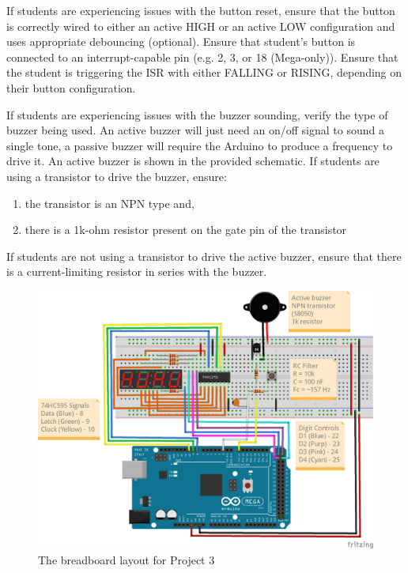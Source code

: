 \documentclass{article}
\begin{document}
        If students are experiencing issues with the button reset, ensure that the button is correctly wired to either an active HIGH or an active LOW configuration and uses appropriate debouncing (optional).
        Ensure that student's button is connected to an interrupt-capable pin (e.g. 2, 3, or 18 (Mega-only)).
        Ensure that the student is triggering the ISR with either FALLING or RISING, depending on their button configuration.

        If students are experiencing issues with the buzzer sounding, verify the type of buzzer being used.
        An active buzzer will just need an on/off signal to sound a single tone, a passive buzzer will require the Arduino to produce a frequency to drive it.
        An active buzzer is shown in the provided schematic.
        If students are using a transistor to drive the buzzer, ensure:
        \begin{enumerate}
            \item the transistor is an NPN type and,
            \item there is a 1k-ohm resistor present on the gate pin of the transistor
        \end{enumerate}
        If students are not using a transistor to drive the active buzzer, ensure that there is a current-limiting resistor in series with the buzzer.

        \begin{figure}
            \centering
            \includegraphics[]{p3_7seg_counter_ugrad_bb.png}
            \caption{The breadboard layout for Project 3}
            \label{fig:p3_7seg_counter_bb}
        \end{figure}
\end{document}
